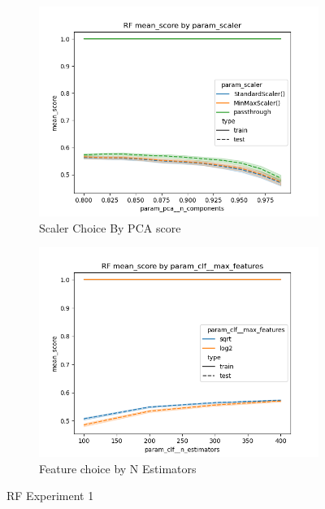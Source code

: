 \documentclass[12pt]{article}
\begin{document}
\begin{figure}
    \begin{subfigure}{.5\textwidth}
        \includegraphics[width=.95\textwidth]{../../results_Experiment1/rf/param_scaler_mean_score_param_pca__n_components.png}
        \caption{Scaler Choice By PCA score}
        \end{subfigure}%
      \begin{subfigure}{.5\textwidth}
        \includegraphics[width=.95\textwidth]{../../results_Experiment1/rf/param_clf__max_features_mean_score_param_clf__n_estimators.png}
        \caption{Feature choice by N Estimators}
      \end{subfigure}
      \caption{RF Experiment 1}
      \label{figure4}
\end{figure}
\end{document}
